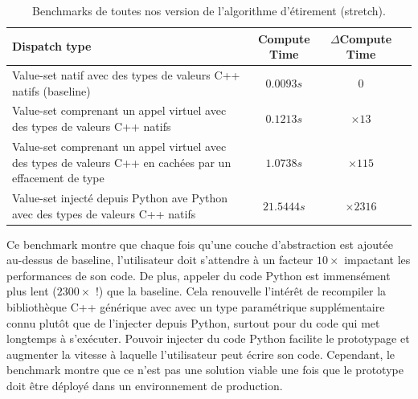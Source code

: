 \begin{table}[htbp]
  \footnotesize
  \centering
  \begin{tabular}{l|ccc}
    \toprule
    Dispatch type                                                                                            &
    Compute Time                                                                                             &
    \(\Delta{}\)Compute Time
    \\ \midrule Value-set natif avec des types de valeurs C++ natifs (baseline)
                                                                                                             & \(0.0093s\) & \(0\) \\
    Value-set comprenant un appel virtuel avec des types de valeurs C++ natifs                               &
    \(0.1213s\)                                                                                              &
    \(\times 13\)
    \\
    Value-set comprenant un appel virtuel avec des types de valeurs C++ en cachées par un effacement de type &
    \(1.0738s\)                                                                                              &
    \(\times 115\)
    \\
    Value-set injecté depuis Python ave Python avec des types de valeurs C++ natifs                          &
    \(21.5444s\)                                                                                             &
    \(\times 2316\)
    \\
    \bottomrule
  \end{tabular}
  \caption[]{Benchmarks de toutes nos version de l'algorithme d'étirement (stretch).}
  \label{resume:table:static.dynamic.perfs}
\end{table}

Ce benchmark montre que chaque fois qu'une couche d'abstraction est ajoutée au-dessus de baseline, l'utilisateur doit
s'attendre à un facteur \(10\times\) impactant les performances de son code. De plus, appeler du code Python est
immensément plus lent (\(2300\times\) !) que la baseline. Cela renouvelle l'intérêt de recompiler la bibliothèque C++
générique avec avec un type paramétrique supplémentaire connu plutôt que de l'injecter depuis Python, surtout pour du
code qui met longtemps à s'exécuter. Pouvoir injecter du code Python facilite le prototypage et augmenter la vitesse à
laquelle l'utilisateur peut écrire son code. Cependant, le benchmark montre que ce n'est pas une solution viable une
fois que le prototype doit être déployé dans un environnement de production.

